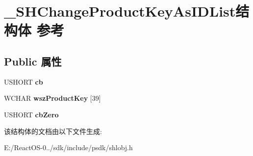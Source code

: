 \hypertarget{struct___s_h_change_product_key_as_i_d_list}{}\section{\+\_\+\+S\+H\+Change\+Product\+Key\+As\+I\+D\+List结构体 参考}
\label{struct___s_h_change_product_key_as_i_d_list}
\subsection*{Public 属性}
\begin{DoxyCompactItemize}
\item 
\mbox{\label{struct___s_h_change_product_key_as_i_d_list_a74757b8bb2ebcd6f87cd9121a6c7daaa}} 
U\+S\+H\+O\+RT {\bfseries cb}
\item 
\mbox{\label{struct___s_h_change_product_key_as_i_d_list_a20d26df0b7a44a6ceb7b87a3d4c6c642}} 
W\+C\+H\+AR {\bfseries wsz\+Product\+Key} \mbox{[}39\mbox{]}
\item 
\mbox{\label{struct___s_h_change_product_key_as_i_d_list_aaaaa78fc7b8cce3fbdd8aa73732e6d33}} 
U\+S\+H\+O\+RT {\bfseries cb\+Zero}
\end{DoxyCompactItemize}


该结构体的文档由以下文件生成\+:\begin{DoxyCompactItemize}
\item 
E\+:/\+React\+O\+S-\/0../sdk/include/psdk/shlobj.\+h\end{DoxyCompactItemize}
